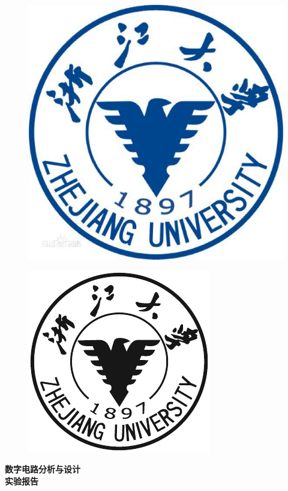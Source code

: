 \documentclass{article}
\begin{document}
\begin{titlepage}
        \vspace*{-3cm}
	
	\begin{figure}[h]
		\centering
		\includegraphics[width=0.7\linewidth]{zjdx}
	\end{figure}

	\vspace*{0.5cm}
	\begin{figure}[h]
		\centering
		\includegraphics[width=0.5\linewidth]{QSY}
	\end{figure}
	\vspace{-0.5cm}
	\begin{center}
		\Huge{\textbf{数字电路分析与设计}}\\
		
		\Huge{\textbf{实验报告}}
	\end{center}
	
	\vspace*{0.5cm}



\end{titlepage}
\end{document}

